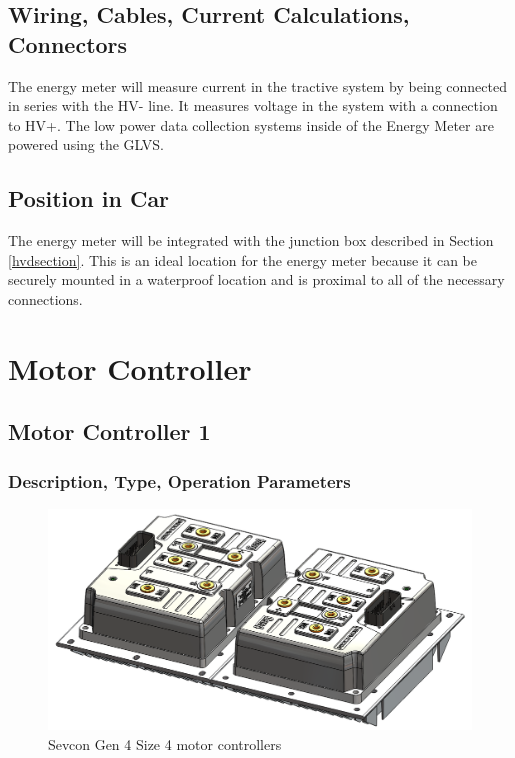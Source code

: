 \documentclass{article}
\begin{document}
    \subsection{Wiring, Cables, Current Calculations, Connectors}


        The energy meter will measure current in the tractive system by being connected in series with the HV- line. It measures voltage in the system with a connection to HV+. The low power data collection systems inside of the Energy Meter are powered using the GLVS.

    \subsection{Position in Car}

        The energy meter will be integrated with the junction box described in Section \ref{hvdsection}. This is an ideal location for the energy meter because it can be securely mounted in a waterproof location and is proximal to all of the necessary connections.

\newpage

\section{Motor Controller} \label{MCs}

    \subsection{Motor Controller 1} \label{MC1}

        \subsubsection{Description, Type, Operation Parameters}


            \begin{figure}[H]
                \centering
                \includegraphics[width = 0.7 \textwidth]{motorcontrollers_separate}
                \caption{Sevcon Gen 4 Size 4 motor controllers}
                \label{mcoffcar}
            \end{figure}
\end{document}
